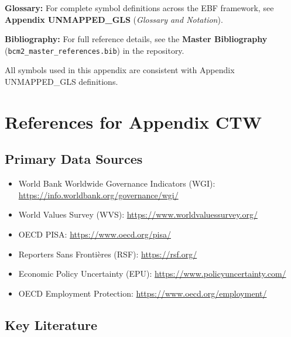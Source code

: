 \begin{tcolorbox}[colback=blue!5!white, colframe=blue!75!black, 
    title=\textbf{Central References}]

\textbf{Glossary:} For complete symbol definitions across the EBF framework, 
see \textbf{Appendix UNMAPPED_GLS} (\textit{Glossary and Notation}).

\textbf{Bibliography:} For full reference details, see the 
\textbf{Master Bibliography} (\texttt{bcm2\_master\_references.bib}) 
in the repository.

All symbols used in this appendix are consistent with Appendix UNMAPPED_GLS definitions.

\end{tcolorbox}

\section{References for Appendix CTW}
\label{sec:V-references}

\subsection{Primary Data Sources}

\begin{itemize}[nosep]
    \item World Bank Worldwide Governance Indicators (WGI): \url{https://info.worldbank.org/governance/wgi/}
    \item World Values Survey (WVS): \url{https://www.worldvaluessurvey.org/}
    \item OECD PISA: \url{https://www.oecd.org/pisa/}
    \item Reporters Sans Frontières (RSF): \url{https://rsf.org/}
    \item Economic Policy Uncertainty (EPU): \url{https://www.policyuncertainty.com/}
    \item OECD Employment Protection: \url{https://www.oecd.org/employment/}
\end{itemize}

\subsection{Key Literature}

